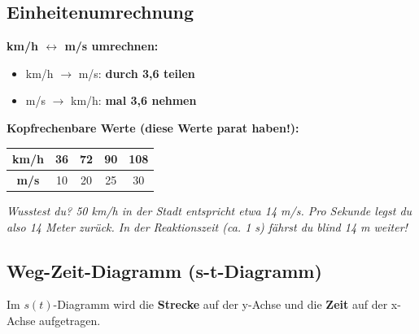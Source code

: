 \documentclass[11pt,a4paper]{article}
\begin{document}
\subsection{Einheitenumrechnung}

\begin{tipp}
\textbf{km/h $\leftrightarrow$ m/s umrechnen:}
\begin{itemize}
\item km/h $\rightarrow$ m/s: \textbf{durch 3,6 teilen}
\item m/s $\rightarrow$ km/h: \textbf{mal 3,6 nehmen}
\end{itemize}

\vspace{0.3cm}
\textbf{Kopfrechenbare Werte (diese Werte parat haben!):}
\begin{center}
\begin{tabular}{|c|c|c|c|c|}
\hline
\rowcolor{lightblue}
\textbf{km/h} & 36 & 72 & 90 & 108 \\
\hline
\textbf{m/s} & 10 & 20 & 25 & 30 \\
\hline
\end{tabular}
\end{center}

\textit{Wusstest du? 50 km/h in der Stadt entspricht etwa 14 m/s. Pro Sekunde legst du also 14 Meter zurück. In der Reaktionszeit (ca. 1 s) fährst du blind 14 m weiter!}
\end{tipp}

\subsection{Weg-Zeit-Diagramm (s-t-Diagramm)}

Im $s(t)$-Diagramm wird die \textbf{Strecke} auf der y-Achse und die \textbf{Zeit} auf der x-Achse aufgetragen.

\begin{center}
\end{center}
\end{document}
